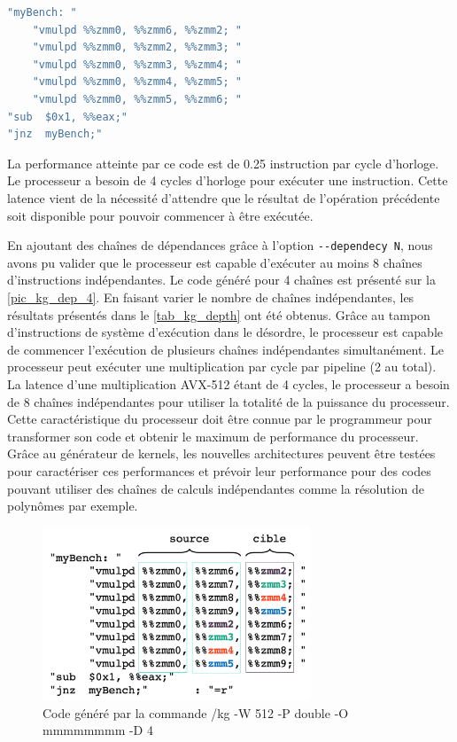     
\begin{lstlisting}[label=lst_dep1,language=C, caption=Code généré par la commande /kg -W 512 -P double -O mmmmm -D 1]
"myBench: " 
	"vmulpd %%zmm0, %%zmm6, %%zmm2; "
	"vmulpd %%zmm0, %%zmm2, %%zmm3; "
	"vmulpd %%zmm0, %%zmm3, %%zmm4; "
	"vmulpd %%zmm0, %%zmm4, %%zmm5; "
	"vmulpd %%zmm0, %%zmm5, %%zmm6; "
"sub  $0x1, %%eax;"
"jnz  myBench;"
\end{lstlisting}

    La performance atteinte par ce code est de 0.25 instruction par cycle d'horloge. Le processeur a besoin de 4 cycles d'horloge pour exécuter une instruction. Cette latence vient de la nécessité d'attendre que le résultat de l'opération précédente soit disponible pour pouvoir commencer à être exécutée. 
    
    En ajoutant des chaînes de dépendances grâce à l'option \verb|--dependecy N|, nous avons pu valider que le processeur est capable d'exécuter au moins 8 chaînes d'instructions indépendantes. Le code généré pour 4 chaînes est présenté sur la \autoref{pic_kg_dep_4}. En faisant varier le nombre de chaînes indépendantes, les résultats présentés dans le \autoref{tab_kg_depth} ont été obtenus. Grâce au tampon d'instructions de système d'exécution dans le désordre, le processeur est capable de commencer l'exécution de plusieurs chaînes indépendantes simultanément. Le processeur peut exécuter une multiplication par cycle par pipeline (2 au total). La latence d'une multiplication AVX-512 étant de 4 cycles, le processeur a besoin de 8 chaînes indépendantes pour utiliser la totalité de la puissance du processeur. Cette caractéristique du processeur doit être connue par le programmeur pour transformer son code et obtenir le maximum de performance du processeur. Grâce au générateur de kernels, les nouvelles architectures peuvent être testées pour caractériser ces performances et prévoir leur performance pour des codes pouvant utiliser des chaînes de calculs indépendantes comme la résolution de polynômes par exemple. 
    
         \begin{figure}
            \center
            \includegraphics[width=8cm]{images/kg_dep_4.png}
            \caption{\label{pic_kg_dep_4} Code généré par la commande /kg -W 512 -P double -O mmmmmmmm -D 4}
        \end{figure}

